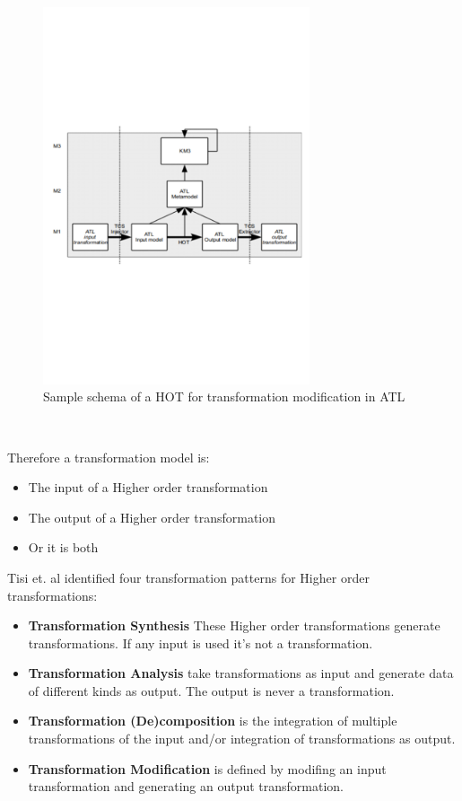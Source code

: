 \documentclass{llncs}
\begin{document}
 \begin{figure}[tb]
	\centering
	\includegraphics[width=0.7\textwidth,natwidth=610,natheight=642]{figures/HOT.pdf}
	\caption{Sample schema of a HOT for transformation modification in ATL}
	\label{fig:samplefigure_pdf}
\end{figure}~\cite{misc:ModelingLanguages}

Therefore a transformation model is:

\begin{itemize}
	\item The input of a Higher order transformation
	\item The output of a Higher order transformation
	\item Or it is both
\end{itemize}

Tisi et. al identified four transformation patterns for Higher order transformations:

\begin{itemize}
	\item \textbf{Transformation Synthesis} These Higher order transformations generate transformations. If any input is used it's not a transformation.
	\item \textbf{Transformation Analysis} take transformations as input and generate data of different kinds as output. The output is never a transformation.
	\item \textbf{Transformation (De)composition} is the integration of multiple transformations of the input and/or integration of transformations as output.
	\item \textbf{Transformation Modification} is defined by modifing an input transformation and generating an output transformation.
\end{itemize}
\end{document}
